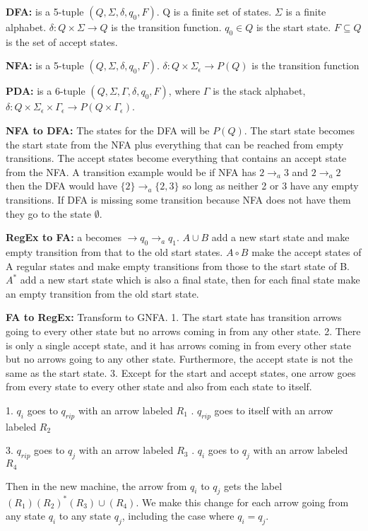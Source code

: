\documentclass[10pt]{article}
\begin{document}
\textbf{DFA:} is a 5-tuple $(Q,\Sigma,\delta,q_0,F)$. Q is a finite set of states. $\Sigma$ is a finite alphabet. $\delta: Q \times \Sigma \rightarrow Q$ is the transition function. $q_0 \in Q$ is the start state. $F \subseteq Q$ is the set of accept states.

\textbf{NFA:} is a 5-tuple $(Q,\Sigma,\delta,q_0,F)$. $\delta: Q \times \Sigma_\epsilon \rightarrow P(Q)$ is the transition function

\textbf{PDA:} is a 6-tuple $(Q,\Sigma,\Gamma,\delta,q_0,F)$, where $\Gamma$ is the stack alphabet, $\delta: Q \times \Sigma_\epsilon \times \Gamma_\epsilon \rightarrow P(Q \times \Gamma_\epsilon)$.

\textbf{NFA to DFA:} The states for the DFA will be $P(Q)$. The start state becomes the start state from the NFA plus everything that can be reached from empty transitions. The accept states become everything that contains an accept state from the NFA. A transition example would be if NFA has $2 \rightarrow_a 3$ and $2 \rightarrow_a 2$ then the DFA would have $\{2\} \rightarrow_a \{2,3\}$ so long as neither 2 or 3 have any empty transitions. If DFA is missing some transition because NFA does not have them they go to the state $\emptyset$.

\textbf{RegEx to FA:} a becomes $\rightarrow q_0 \rightarrow_a q_1$. $A \cup B$ add a new start state and make empty transition from that to the old start states. $A \circ B$ make the accept states of A regular states and make empty transitions from those to the start state of B. $A^*$ add a new start state which is also a final state, then for each final state make an empty transition from the old start state.

\textbf{FA to RegEx:} Transform to GNFA. 1. The start state has transition arrows going to every other state but no arrows coming in from any other state. 2. There is only a single accept state, and it has arrows coming in from every other state but no arrows going to any other state. Furthermore, the accept state is not the same as the start state. 3. Except for the start and accept states, one arrow goes from every state to every other state and also from each state to itself.

1. $q_i$ goes to $q_{rip}$ with an arrow labeled $R_1$
. $q_{rip}$ goes to itself with an arrow labeled $R_2$

3. $q_{rip}$ goes to $q_j$ with an arrow labeled $R_3$
. $q_i$ goes to $q_j$ with an arrow labeled $R_4$

Then in the new machine, the arrow from $q_i$ to $q_j$ gets the label $(R_1)(R_2)^*(R_3)\cup(R_4)$. We make this change for each arrow going from any state $q_i$ to any state $q_j$, including the case where $q_i = q_j$.
\end{document}
